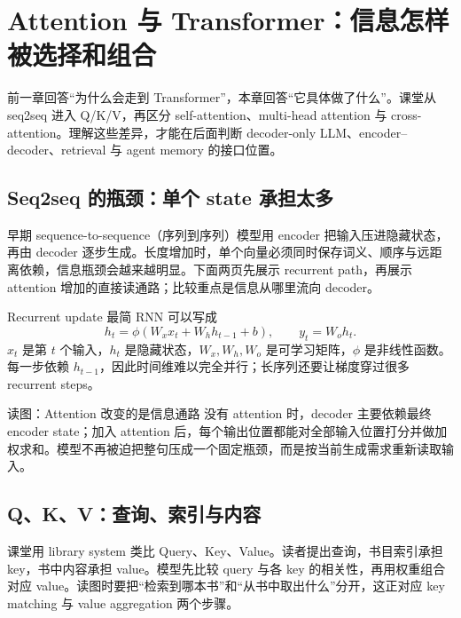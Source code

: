\section{Attention 与 Transformer：信息怎样被选择和组合}

前一章回答“为什么会走到 Transformer”，本章回答“它具体做了什么”。课堂从 seq2seq 进入 Q/K/V，再区分 self-attention、multi-head attention 与 cross-attention。理解这些差异，才能在后面判断 decoder-only LLM、encoder--decoder、retrieval 与 agent memory 的接口位置。

\subsection{Seq2seq 的瓶颈：单个 state 承担太多}

早期 sequence-to-sequence（序列到序列）模型用 encoder 把输入压进隐藏状态，再由 decoder 逐步生成。长度增加时，单个向量必须同时保存词义、顺序与远距离依赖，信息瓶颈会越来越明显。下面两页先展示 recurrent path，再展示 attention 增加的直接读通路；比较重点是信息从哪里流向 decoder。


\begin{importantbox}{Recurrent update}
最简 RNN 可以写成
\[
h_t=\phi(W_xx_t+W_hh_{t-1}+b),\qquad y_t=W_oh_t.
\]
$x_t$ 是第 $t$ 个输入，$h_t$ 是隐藏状态，$W_x,W_h,W_o$ 是可学习矩阵，$\phi$ 是非线性函数。每一步依赖 $h_{t-1}$，因此时间维难以完全并行；长序列还要让梯度穿过很多 recurrent steps。
\end{importantbox}


\begin{knowledgebox}{读图：Attention 改变的是信息通路}
没有 attention 时，decoder 主要依赖最终 encoder state；加入 attention 后，每个输出位置都能对全部输入位置打分并做加权求和。模型不再被迫把整句压成一个固定瓶颈，而是按当前生成需求重新读取输入。
\end{knowledgebox}

\subsection{Q、K、V：查询、索引与内容}

课堂用 library system 类比 Query、Key、Value。读者提出查询，书目索引承担 key，书中内容承担 value。模型先比较 query 与各 key 的相关性，再用权重组合对应 value。读图时要把“检索到哪本书”和“从书中取出什么”分开，这正对应 key matching 与 value aggregation 两个步骤。

